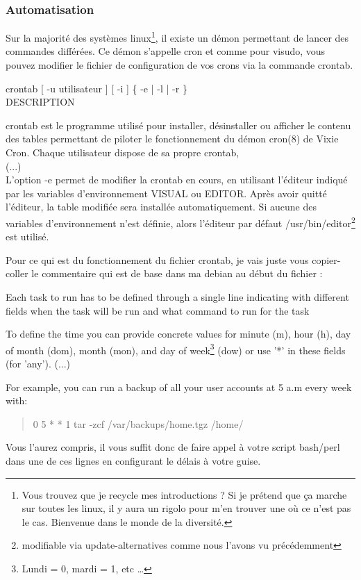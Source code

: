 \documentclass[a4paper]{article}
\newcommand{\commande}[1] {
    \begin{quote}
    \tt\raggedright #1 
    \end{quote}
}
\newcommand{\man}[2]{
    \begin{tcolorbox}[toprule=3mm,width=\textwidth,outer arc=0mm,colbacktitle=grayman,coltitle=black,colback={grayman},colframe={grayman},title={man : \tt #1}]
        \tt\raggedright #2
    \end{tcolorbox}
}
\newcommand{\mandesc}[1]{
    \begin{adjustwidth}{0.8cm}{}
        #1
    \end{adjustwidth}
}
\begin{document}
\subsubsection{Automatisation}
\par Sur la majorité des systèmes linux\footnote{Vous trouvez que je recycle mes introductions ? Si je prétend que ça marche sur toutes les linux, il y aura un rigolo pour m'en trouver une où ce n'est pas le cas. Bienvenue dans le monde de la diversité.}, il existe un démon permettant de lancer des commandes différées. Ce démon s'appelle cron et comme pour visudo, vous pouvez modifier le fichier de configuration de vos crons via la commande crontab.
\man{crontab}{crontab [ -u utilisateur ] [ -i ] \{ -e | -l | -r \}\\
DESCRIPTION
\mandesc{crontab est le programme utilisé pour installer, désinstaller ou afficher le contenu des tables permettant de piloter le fonctionnement du démon cron(8) de Vixie Cron. Chaque utilisateur dispose de sa propre crontab,\\
(...)\\
L'option -e permet de modifier la crontab en cours, en utilisant l'éditeur indiqué par les variables d'environnement VISUAL ou EDITOR. Après avoir quitté l'éditeur, la table modifiée sera installée automatiquement. Si aucune des variables d'environnement n'est définie, alors l'éditeur par défaut /usr/bin/editor\footnote{modifiable via update-alternatives comme nous l'avons vu précédemment} est utilisé.}}
\par Pour ce qui est du fonctionnement du fichier crontab, je vais juste vous copier-coller le commentaire qui est de base dans ma debian au début du fichier :
\par Each task to run has to be defined through a single line indicating with different fields when the task will be run and what command to run for the task
\par To define the time you can provide concrete values for minute (m), hour (h), day of month (dom), month (mon), and day of week\footnote{Lundi = 0, mardi = 1, etc \dots} (dow) or use '*' in these fields (for 'any'). (...) 
\par For example, you can run a backup of all your user accounts at 5 a.m every week with:
\commande{0 5 * * 1 tar -zcf /var/backups/home.tgz /home/}
\par Vous l'aurez compris, il vous suffit donc de faire appel à votre script bash/perl dans une de ces lignes en configurant le délais à votre guise.
\end{document}
